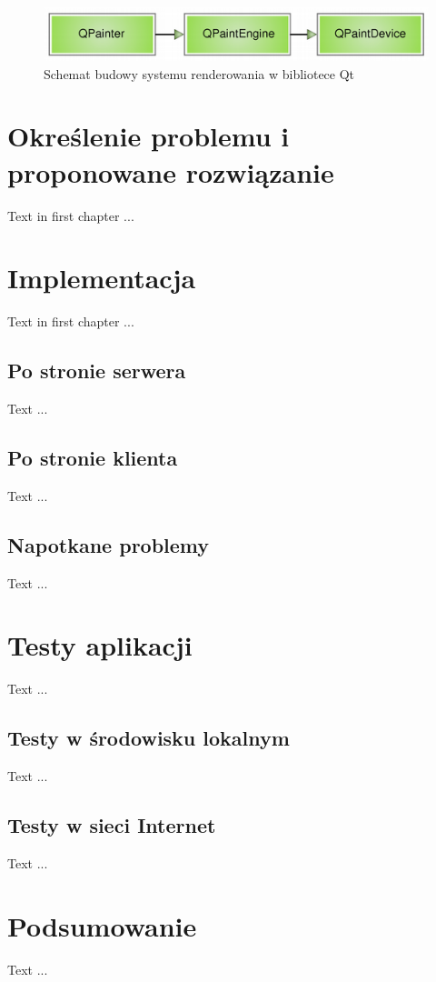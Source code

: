 \documentclass[polish]{inz}
\begin{document}
\begin{figure}
  \centering
  \includegraphics[width=\textwidth,height=!]{img/paintsystem-core.png}
  \caption{Schemat budowy systemu renderowania w bibliotece Qt}
  \label{paintsystem-core}
\end{figure}

\chapter{Określenie problemu i proponowane rozwiązanie}
Text in first chapter ...

\chapter{Implementacja}
Text in first chapter ...

\section{Po stronie serwera}
Text ...

\section{Po stronie klienta}
Text ...

\section{Napotkane problemy}
Text ...

\chapter{Testy aplikacji}
Text ...

\section{Testy w środowisku lokalnym}
Text ...

\section{Testy w sieci Internet}
Text ...

\chapter{Podsumowanie}
Text ...

\printindex
\end{document}
